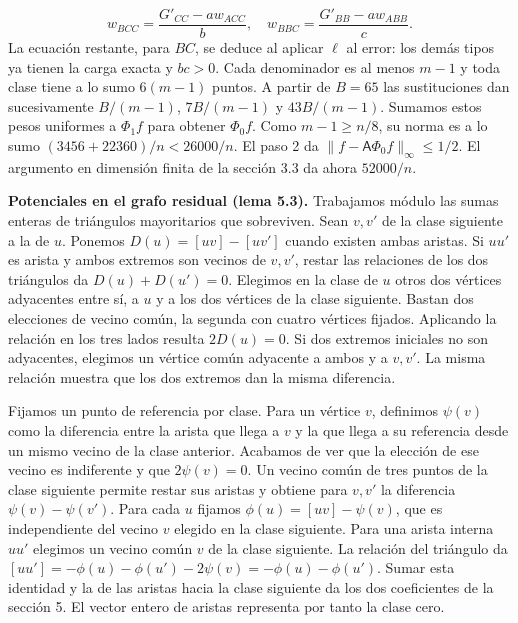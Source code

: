\documentclass[spanish,11pt,a4paper]{article}
\begin{document}
\begin{enumerate}
\[   w_{BCC}=\frac{G'_{CC}-a w_{ACC}}b,\quad
   w_{BBC}=\frac{G'_{BB}-a w_{ABB}}c .\] La ecuación restante, para \(BC\), se deduce al aplicar \(\ell\) al error: los demás tipos ya tienen la carga exacta y \(bc>0\). Cada denominador es al menos \(m-1\) y toda clase tiene a lo sumo \(6(m-1)\) puntos. A partir de \(B=65\) las sustituciones dan sucesivamente \(B/(m-1)\), \(7B/(m-1)\) y \(43B/(m-1)\). Sumamos estos pesos uniformes a \(\Phi_1 f\) para obtener \(\Phi_0 f\). Como \(m-1\ge n/8\), su norma es a lo sumo \((3456+22360)/n<26000/n\). El paso 2 da \(\|f-\mathsf A\Phi_0 f\|_\infty\le1/2\). El argumento en dimensión finita de la sección 3.3 da ahora \(52000/n\).
\end{enumerate}

\textbf{Potenciales en el grafo residual (lema 5.3).} Trabajamos módulo las sumas enteras de triángulos mayoritarios que sobreviven. Sean \(v,v'\) de la clase siguiente a la de \(u\). Ponemos \(D(u)=[uv]-[uv']\) cuando existen ambas aristas. Si \(uu'\) es arista y ambos extremos son vecinos de \(v,v'\), restar las relaciones de los dos triángulos da \(D(u)+D(u')=0\). Elegimos en la clase de \(u\) otros dos vértices adyacentes entre sí, a \(u\) y a los dos vértices de la clase siguiente. Bastan dos elecciones de vecino común, la segunda con cuatro vértices fijados. Aplicando la relación en los tres lados resulta \(2D(u)=0\). Si dos extremos iniciales no son adyacentes, elegimos un vértice común adyacente a ambos y a \(v,v'\). La misma relación muestra que los dos extremos dan la misma diferencia.

Fijamos un punto de referencia por clase. Para un vértice \(v\), definimos \(\psi(v)\) como la diferencia entre la arista que llega a \(v\) y la que llega a su referencia desde un mismo vecino de la clase anterior. Acabamos de ver que la elección de ese vecino es indiferente y que \(2\psi(v)=0\). Un vecino común de tres puntos de la clase siguiente permite restar sus aristas y obtiene para \(v,v'\) la diferencia \(\psi(v)-\psi(v')\). Para cada \(u\) fijamos \(\phi(u)=[uv]-\psi(v)\), que es independiente del vecino \(v\) elegido en la clase siguiente. Para una arista interna \(uu'\) elegimos un vecino común \(v\) de la clase siguiente. La relación del triángulo da \([uu']=-\phi(u)-\phi(u')-2\psi(v)=-\phi(u)-\phi(u')\). Sumar esta identidad y la de las aristas hacia la clase siguiente da los dos coeficientes de la sección 5. El vector entero de aristas representa por tanto la clase cero.
\end{document}

